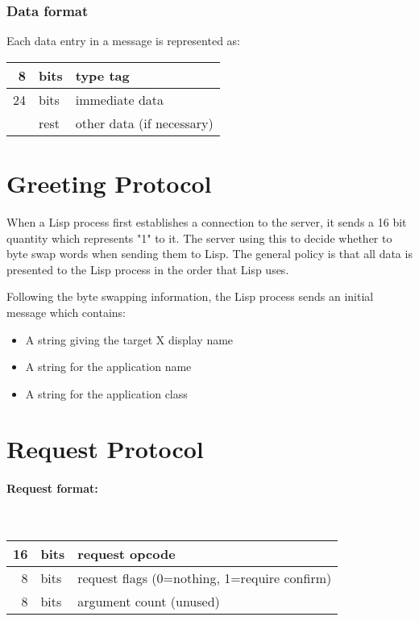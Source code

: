 \documentclass{article}
\begin{document}
\subsubsection{Data format}

Each data entry in a message is represented as:\\[2mm]
\begin{center}
\begin{tabular}{|rl|l|}
\hline
 8 & bits & type tag\\\hline
24 & bits & immediate data\\\hline
   & rest & other data (if necessary)\\\hline
\end{tabular}
\end{center}


\section{Greeting Protocol}

When a Lisp process first establishes a connection to the server, it
sends a 16 bit quantity which represents "1" to it.  The server using this
to decide whether to byte swap words when sending them to Lisp.  The
general policy is that all data is presented to the Lisp process in the
order that Lisp uses.

Following the byte swapping information, the Lisp process sends an
initial message which contains:
\begin{itemize}
\item A string giving the target X display name
\item A string for the application name
\item A string for the application class
\end{itemize}

\section{Request Protocol}

\paragraph{Request format:}{\ }\\[2mm]
\begin{center}
\begin{tabular}{|rl|l|}
\hline
	16 & bits & request opcode\\\hline
	 8 & bits & request flags (0=nothing, 1=require confirm)\\\hline
	 8 & bits & argument count (unused)\\\hline
\end{tabular}
\end{center}
\end{document}
